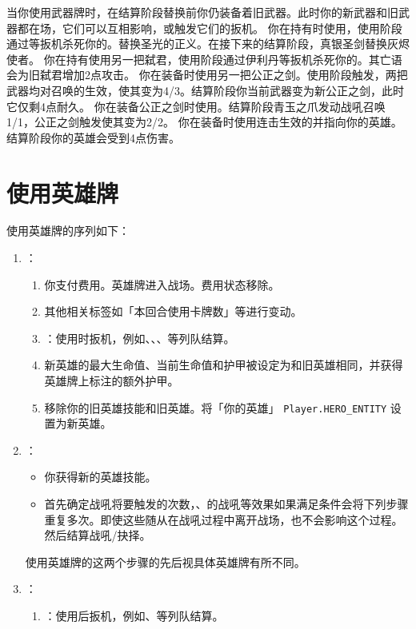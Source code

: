 当你使用武器牌时，在结算阶段替换前你仍装备着旧武器。此时你的新武器和旧武器都在场，它们可以互相影响，或触发它们的扳机。
\example 你在持有时使用，使用阶段通过等扳机杀死你的。替换圣光的正义。在接下来的结算阶段，真银圣剑替换灰烬使者。
\example 你在持有使用另一把弑君，使用阶段通过伊利丹等扳机杀死你的。其亡语会为旧弑君增加2点攻击。
\example 你在装备时使用另一把公正之剑。使用阶段触发，两把武器均对召唤的生效，使其变为4/3。结算阶段你当前武器变为新公正之剑，此时它仅剩4点耐久。
\example 你在装备公正之剑时使用。结算阶段青玉之爪发动战吼召唤1/1，公正之剑触发使其变为2/2。
\example 你在装备时使用连击生效的并指向你的英雄。结算阶段你的英雄会受到4点伤害。
​
\section{使用英雄牌}

使用英雄牌的序列如下：

\begin{enumerate}
    \item {}：
    \begin{enumerate}
        \item 你支付费用。英雄牌进入战场。费用状态移除。
        \item 其他相关标签如「本回合使用卡牌数」等进行变动。
        \item {}：使用时扳机，例如、、、等列队结算。
        \item 新英雄的最大生命值、当前生命值和护甲被设定为和旧英雄相同，并获得英雄牌上标注的额外护甲。
        \item 移除你的旧英雄技能和旧英雄。将「你的英雄」 \texttt{Player.HERO\_ENTITY} 设置为新英雄。
    \end{enumerate}

    \item {}：
    \begin{itemize}
        \item 你获得新的英雄技能。
        \item 首先确定战吼将要触发的次数，、的战吼等效果如果满足条件会将下列步骤重复多次。即使这些随从在战吼过程中离开战场，也不会影响这个过程。然后结算战吼/抉择。
    \end{itemize}
    \notice 使用英雄牌的这两个步骤的先后视具体英雄牌有所不同。

    \item {}：
    \begin{enumerate}
        \item {}：使用后扳机，例如、等列队结算。
    \end{enumerate}
\end{enumerate}

